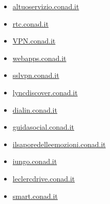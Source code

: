 \documentclass{article}
\begin{document}
\begin{itemize}
        
        
        \item \href{ https://altuoservizio.conad.it/ }{ altuoservizio.conad.it }
    
        
        
        \item \href{ http://rtc.conad.it }{ rtc.conad.it }
    
        
        
        \item \href{ http://VPN.conad.it }{ VPN.conad.it }
    
        
        
        \item \href{ http://webapps.conad.it }{ webapps.conad.it }
    
        
        
        \item \href{ http://sslvpn.conad.it }{ sslvpn.conad.it }
    
        
        
        \item \href{ https://lyncdiscover.conad.it/ }{ lyncdiscover.conad.it }
    
        
        
        \item \href{ https://dialin.conad.it/ }{ dialin.conad.it }
    
        
        
        \item \href{ https://guidasocial.conad.it/ }{ guidasocial.conad.it }
    
        
        
        \item \href{ http://ilsaporedelleemozioni.conad.it/ }{ ilsaporedelleemozioni.conad.it }
    
        
        
        \item \href{ http://iungo.conad.it }{ iungo.conad.it }
    
        
        
        \item \href{ http://leclercdrive.conad.it/ }{ leclercdrive.conad.it }
    
        
        
        \item \href{ http://smart.conad.it }{ smart.conad.it }
    
        
        

\end{itemize}
\end{document}
